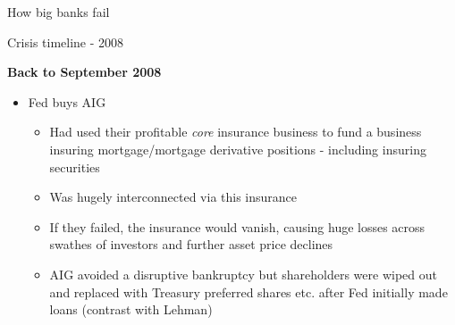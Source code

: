 
\begin{frame}{How big banks fail}

\begin{figure}
\begin{center}


\end{center}
\end{figure}

\end{frame}



\begin{frame}{Crisis timeline - 2008}

\textbf{Back to September 2008}
	\begin{itemize}
	\item[]	Fed buys AIG
		\begin{itemize}
		\item	Had used their profitable \emph{core} insurance business to fund a business insuring mortgage/mortgage derivative positions - including insuring securities
		\item	Was hugely interconnected via this insurance
		\item	If they failed, the insurance would vanish, causing huge losses across swathes of investors and further asset price declines
		\item	AIG avoided a disruptive bankruptcy but shareholders were wiped out and replaced with Treasury preferred shares etc. after Fed initially made loans (contrast with Lehman)
		\end{itemize}
	\end{itemize}

\end{frame}

